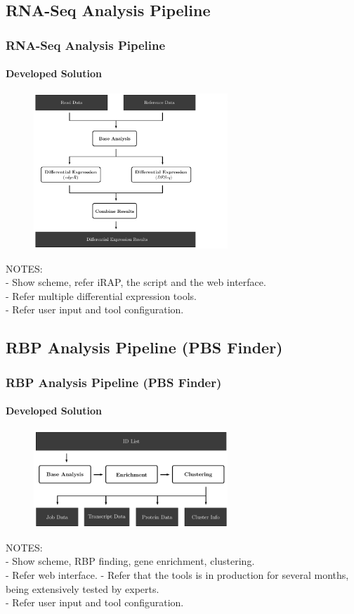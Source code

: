 \documentclass{beamer}
\begin{document}
\subsection{RNA-Seq Analysis Pipeline}
\begin{frame}[allowframebreaks]
  \frametitle{RNA-Seq Analysis Pipeline}
  \framesubtitle{Developed Solution}

\begin{figure}
  \centering
  \includegraphics[width=0.65\textwidth]{tool1}
\end{figure}

NOTES:\\
- Show scheme, refer iRAP, the script and the web interface.\\
- Refer multiple differential expression tools.\\
- Refer user input and tool configuration.\\

\end{frame}

\subsection{RBP Analysis Pipeline (PBS Finder)}
\begin{frame}[allowframebreaks]
  \frametitle{RBP Analysis Pipeline (PBS Finder)}
  \framesubtitle{Developed Solution}

\begin{figure}
  \centering
  \includegraphics[width=0.65\textwidth]{workflow2}
\end{figure}

NOTES:\\
- Show scheme, RBP finding, gene enrichment, clustering.\\
- Refer web interface.
- Refer that the tools is in production for several months, being extensively tested by experts.\\
- Refer user input and tool configuration.\\

\end{frame}
\end{document}
